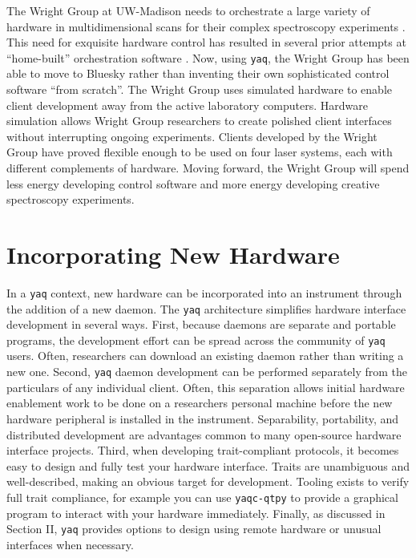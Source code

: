 \documentclass[aip, amsmath, amssymb, reprint,]{revtex4-2}
\newcommand\yaq{\texttt{yaq}}
\begin{document}
The Wright Group at UW-Madison needs to orchestrate a large variety of hardware in multidimensional scans for their complex spectroscopy experiments \cite{MukamelShaul2000a, WrightJohnCurtis2011a}.
This need for exquisite hardware control has resulted in several prior attempts at ``home-built'' orchestration software \cite{CarlsonRogerJohn1988a, MeyerKentAlbert2004b, KainSchuyler2017a, ThompsonBlaiseJonathan2018a, SundenKyle2022}.
Now, using \yaq{}, the Wright Group has been able to move to Bluesky rather than inventing their own sophisticated control software ``from scratch''.
The Wright Group uses simulated hardware to enable client development away from the active laboratory computers.
Hardware simulation allows Wright Group researchers to create polished client interfaces without interrupting  ongoing experiments.
Clients developed by the Wright Group have proved flexible enough to be used on four laser systems, each with different complements of hardware.
Moving forward, the Wright Group will spend less energy developing control software and more energy developing creative spectroscopy experiments.

\section{Incorporating New Hardware}

In a \yaq{} context, new hardware can be incorporated into an instrument through the addition of a new daemon.
The \yaq{} architecture simplifies hardware interface development in several ways.
First, because daemons are separate and portable programs, the development effort can be spread across the community of \yaq{} users.
Often, researchers can download an existing daemon rather than writing a new one.
Second, \yaq{} daemon development can be performed separately from the particulars of any individual client.
Often, this separation allows initial hardware enablement work to be done on a researchers personal machine before the new hardware peripheral is installed in the instrument.
Separability, portability, and distributed development are advantages common to many open-source hardware interface projects.
Third, when developing trait-compliant protocols, it becomes easy to design and fully test your hardware interface.
Traits are unambiguous and well-described, making an obvious target for development.
Tooling exists to verify full trait compliance, for example you can use \texttt{yaqc-qtpy} to provide a graphical program to interact with your hardware immediately.
Finally, as discussed in Section II, \yaq{} provides options to design using remote hardware or unusual interfaces when necessary.
\end{document}
